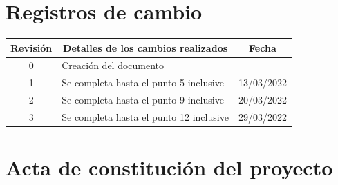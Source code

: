 \documentclass[
11pt, %
codirector, %
]{charter}
\begin{document}
\maketitle
\thispagestyle{empty}
\pagebreak


\thispagestyle{empty}
{\setlength{\parskip}{0pt}
	\tableofcontents{}
}
\pagebreak


\section*{Registros de cambio}
\label{sec:registro}


\begin{table}[ht]
	\label{tab:registro}
	\centering
	\begin{tabularx}{\linewidth}{@{}|c|X|c|@{}}
		\hline
		\rowcolor[HTML]{C0C0C0}
		Revisión & \multicolumn{1}{c|}{\cellcolor[HTML]{C0C0C0}Detalles de los cambios realizados} & Fecha            \\ \hline
		0        & Creación del documento                                                          & \fechaInicioName \\ \hline
		1        & Se completa hasta el punto 5 inclusive                                          & 13/03/2022       \\ \hline
		2        & Se completa hasta el punto 9 inclusive                                          & 20/03/2022       \\ \hline
		3        & Se completa hasta el punto 12 inclusive                                         & 29/03/2022       \\ \hline
	\end{tabularx}
\end{table}

\pagebreak



\section*{Acta de constitución del proyecto}
\label{sec:acta}
\end{document}
